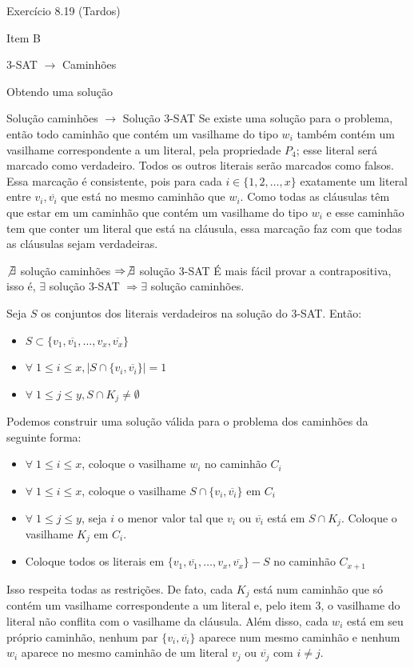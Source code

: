 \documentclass[presentation]{beamer}
\begin{document}
\begin{frame}[fragile,label=sec-6]{Exercício 8.19 (Tardos)}
\begin{block}{Item B}
\begin{block}{3-SAT $\to$ Caminhões}
\begin{block}{Obtendo uma solução}
\begin{block}{Solução caminhões $\to$ Solução 3-SAT}
Se existe uma solução para o problema, então todo caminhão que contém
um vasilhame do tipo $w_i$ também contém um vasilhame correspondente a
um literal, pela propriedade $P_4$; esse literal será marcado como
verdadeiro. Todos os outros literais serão marcados como falsos. Essa
marcação é consistente, pois para cada $i \in \{1, 2, \ldots, x\}$
exatamente um literal entre $v_i, \overline{v_i}$ que está no mesmo
caminhão que $w_i$. Como todas as cláusulas têm que estar em um
caminhão que contém um vasilhame do tipo $w_i$ e esse caminhão tem que
conter um literal que está na cláusula, essa marcação faz com que
todas as cláusulas sejam verdadeiras.
\end{block}


\begin{block}{$\not \exists$ solução caminhões $\Rightarrow \not \exists$ solução 3-SAT}
É mais fácil provar a contrapositiva, isso é, $\exists$ solução 3-SAT
$\Rightarrow \exists$ solução caminhões.

Seja $S$ os conjuntos dos literais verdadeiros na solução do 3-SAT.
Então:
\begin{itemize}
\item $S \subset \{v_1,\overline{v_1}, \ldots, v_x, \overline{v_x}\}$
\item $\forall \; 1\leq i \leq x, |S\cap\{v_i, \overline{v_i}\}| = 1$
\item $\forall \; 1\leq j \leq y, S\cap K_j \neq \emptyset$
\end{itemize}

Podemos construir uma solução válida para o problema dos caminhões da
seguinte forma:
\begin{itemize}
\item $\forall \; 1\leq i \leq x$, coloque o vasilhame $w_i$ no caminhão $C_i$
\item $\forall \; 1\leq i \leq x$, coloque o vasilhame $S\cap\{v_i, \overline{v_i}\}$ em $C_i$
\item $\forall \; 1\leq j \leq y$, seja $i$ o menor valor tal que $v_i$ ou
$\overline{v_i}$ está em $S\cap K_j$. Coloque o vasilhame $K_j$ em $C_i$.
\item Coloque todos os literais em $\{v_1,\overline{v_1}, \ldots, v_x,
  \overline{v_x}\} - S$ no caminhão $C_{x+1}$
\end{itemize}


Isso respeita todas as restrições. De fato, cada $K_j$ está num
caminhão que só contém um vasilhame correspondente a um literal e,
pelo item 3, o vasilhame do literal não conflita com o vasilhame da
cláusula. Além disso, cada $w_i$ está em seu próprio caminhão, nenhum
par $\{v_i, \overline{v_i}\}$ aparece num mesmo caminhão e nenhum
$w_i$ aparece no mesmo caminhão de um literal $v_j$ ou
$\overline{v_j}$ com $i \neq j$.
\end{block}
\end{block}
\end{block}
\end{block}
\end{frame}
\end{document}
